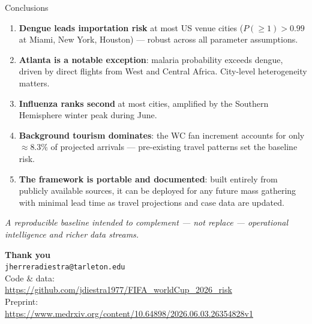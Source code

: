 \documentclass[aspectratio=169, 11pt]{beamer}
\begin{document}
\begin{frame}{Conclusions}
  \begin{enumerate}
    \item \textbf{Dengue leads importation risk} at most US venue cities
          ($P(\geq 1)>0.99$ at Miami, New York, Houston) --- robust
          across all parameter assumptions.

    \item \textbf{Atlanta is a notable exception}: malaria probability
          exceeds dengue, driven by direct flights from West and Central
          Africa. City-level heterogeneity matters.

    \item \textbf{Influenza ranks second} at most cities, amplified by
          the Southern Hemisphere winter peak during June.

    \item \textbf{Background tourism dominates}: the WC fan increment
          accounts for only $\approx 8.3\%$ of projected arrivals ---
          pre-existing travel patterns set the baseline risk.

    \item \textbf{The framework is portable and documented}: built
          entirely from publicly available sources, it can be
          deployed for any future mass gathering with minimal lead
          time as travel projections and case data are updated.
  \end{enumerate}

  \vspace{0.3em}
  {\small\textit{A reproducible baseline intended to complement ---
  not replace --- operational intelligence and richer data streams.}}
\end{frame}

\begin{frame}[plain]
  \vfill
  \begin{center}
    {\Large\textbf{Thank you}}\\[1em]
    \texttt{jherreradiestra@tarleton.edu}\\[0.8em]
    {\small Code \& data:}\\[0.2em]
    {\small\url{https://github.com/jdiestra1977/FIFA_worldCup_2026_risk}}\\[0.6em]
    {\small Preprint:}\\[0.2em]
    {\small\url{https://www.medrxiv.org/content/10.64898/2026.06.03.26354828v1}}
  \end{center}
  \vfill
\end{frame}

\end{document}
